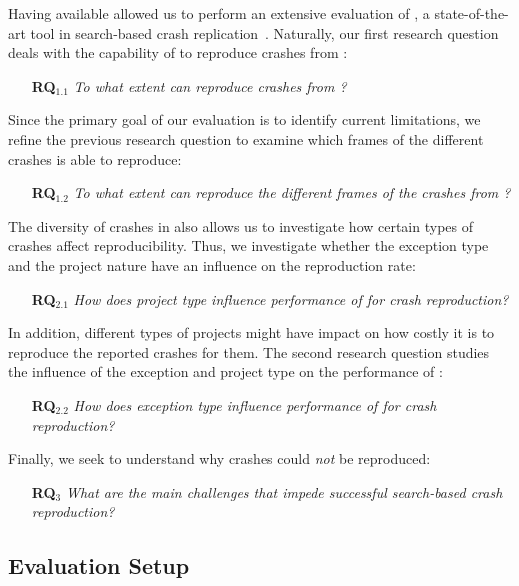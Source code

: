 
Having \crashpack available allowed us to perform an extensive evaluation of \evocrash, a state-of-the-art tool in search-based crash replication~\cite{Soltani2018a}.
Naturally, our first research question deals with the capability of \evocrash to reproduce crashes from \crashpack: 
%
\begin{itemize}
    \item[\textbf{RQ$_{1.1}$}] \textit{To what extent can \evocrash reproduce crashes from \crashpack?}
\end{itemize}
%
Since the primary goal of our evaluation is to identify current limitations, we refine the previous research question to examine which frames of the different crashes \evocrash is able to reproduce:
%
\begin{itemize}
    \item[\textbf{RQ$_{1.2}$}] \textit{To what extent can \evocrash reproduce the different frames of the crashes from \crashpack?}
\end{itemize}
%
The diversity of crashes in \crashpack also allows us to investigate how certain types of crashes affect reproducibility.
Thus, we investigate whether the exception type and  the project nature have an influence on the reproduction rate:
\begin{itemize}
   \item[\textbf{RQ$_{2.1}$}] \textit{How does project type influence performance of \evocrash for crash reproduction?}
\end{itemize}
In addition, different types of projects might have impact on how costly it is to reproduce the reported crashes for them.
The second research question studies the influence of the exception and project type on the performance of \evocrash:
%
\begin{itemize}
   \item[\textbf{RQ$_{2.2}$}] \textit{How does exception type influence performance of \evocrash for crash reproduction?}
\end{itemize}
%
Finally, we seek to understand why crashes could \emph{not} be reproduced:
%
\begin{itemize}
    \item[\textbf{RQ$_{3}$\phantom{y}}] \textit{What are the main challenges that impede successful search-based crash reproduction?}
\end{itemize}

\subsection{Evaluation Setup}
\label{se:evalsetup}

